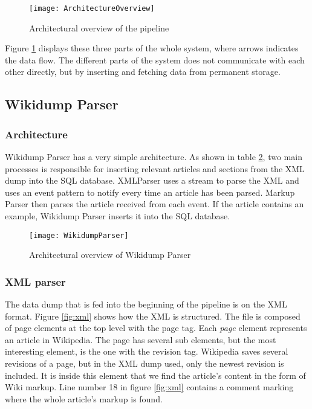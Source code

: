 \begin{figure}[H]
\caption{Architectural overview of the pipeline}
\texttt{[image: ArchitectureOverview]}
\label{fig:pipeline_arch}
\end{figure}

Figure \ref{fig:pipeline_arch} displays these three parts of the whole system, where arrows indicates the data flow. The different parts of the system does not communicate with each other directly, but by inserting and fetching data from permanent storage. 


\subsection{Wikidump Parser}

\subsubsection{Architecture}
Wikidump Parser has a very simple architecture. As shown in table \ref{fig:wikidump_parser}, two main processes is responsible for inserting relevant articles and sections from the XML dump into the SQL database. XMLParser uses a stream to parse the XML and uses an event pattern to notify every time an article has been parsed. Markup Parser then parses the article received from each event. If the article contains an example, Wikidump Parser inserts it into the SQL database.

\begin{figure}[h]
\caption{Architectural overview of Wikidump Parser}
\texttt{[image: WikidumpParser]}
\label{fig:wikidump_parser}
\end{figure}

\subsubsection{XML parser}

The data dump that is fed into the beginning of the pipeline is on the XML format. Figure \ref{fig:xml} shows how the XML is structured. The file is composed of page elements at the top level with the page tag. Each \textit{page} element represents an article in Wikipedia. The page has several sub elements, but the most interesting element, is the one with the revision tag. Wikipedia saves several revisions of a page, but in the XML dump used, only the newest revision is included. It is inside this element that we find the article's content in the form of Wiki markup. Line number 18 in figure \ref{fig:xml} contains a comment marking where the whole article's markup is found.

